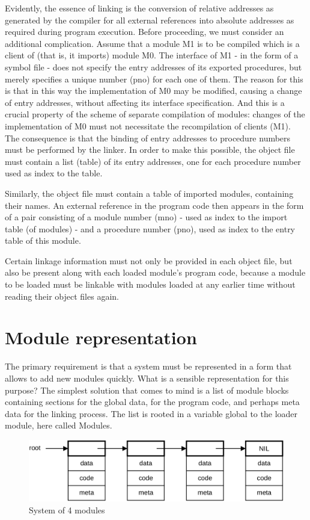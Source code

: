 Evidently, the essence of linking is the conversion of relative addresses as generated by the compiler
for all external references into absolute addresses as required during program execution. Before
proceeding, we must consider an additional complication. Assume that a module M1 is to be
compiled which is a client of (that is, it imports) module M0. The interface of M1 - in the form of a
symbol file - does not specify the entry addresses of its exported procedures, but merely specifies a
unique number (pno) for each one of them. The reason for this is that in this way the implementation
of M0 may be modified, causing a change of entry addresses, without affecting its interface
specification. And this is a crucial property of the scheme of separate compilation of modules:
changes of the implementation of M0 must not necessitate the recompilation of clients (M1). The
consequence is that the binding of entry addresses to procedure numbers must be performed by the
linker. In order to make this possible, the object file must contain a list (table) of its entry addresses,
one for each procedure number used as index to the table.

Similarly, the object file must contain a table of imported modules, containing their names. An
external reference in the program code then appears in the form of a pair consisting of a module
number (mno) - used as index to the import table (of modules) - and a procedure number (pno), used
as index to the entry table of this module.

Certain linkage information must not only be provided in each object file, but also be present along
with each loaded module's program code, because a module to be loaded must be linkable with
modules loaded at any earlier time without reading their object files again.

\section{Module representation}
The primary requirement is that a system must be represented in a form that allows to add new
modules quickly. What is a sensible representation for this purpose? The simplest solution that
comes to mind is a list of module blocks containing sections for the global data, for the program code,
and perhaps meta data for the linking process. The list is rooted in a variable global to the loader
module, here called Modules.
\begin{figure}
	\label{fig:4modules}
	\centering
	\includegraphics[width=\textwidth]{i/j}
	\caption{System of 4 modules}
\end{figure}

